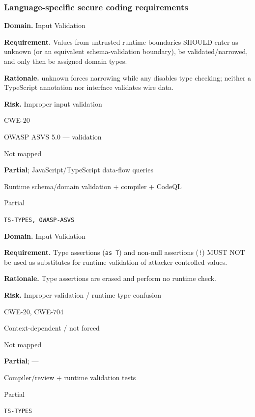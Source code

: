 \documentclass[10pt,letterpaper]{article}
\newcommand{\code}[1]{\texttt{\small #1}}
\newcommand{\prioritybadge}[2]{\tcbox[on line,boxrule=0pt,arc=1.2mm,boxsep=0.7mm,left=1mm,right=1mm,top=0.4mm,bottom=0.4mm,colback=#2!12,coltext=#2]{\scriptsize\bfseries #1}}
\begin{document}
\subsubsection*{Language-specific secure coding requirements}

\begin{rulebox}[title={\texttt{SCS-TS-INPUT-001} \hfill \prioritybadge{High Priority}{High}}]
\textbf{Domain.} Input Validation

\textbf{Requirement.} Values from untrusted runtime boundaries SHOULD enter as unknown (or an equivalent schema-validation boundary), be validated/narrowed, and only then be assigned domain types.

\textbf{Rationale.} unknown forces narrowing while any disables type checking; neither a TypeScript annotation nor interface validates wire data.

\textbf{Risk.} Improper input validation

\begin{description}[leftmargin=2.65cm,labelwidth=2.3cm,style=nextline,itemsep=1pt,topsep=3pt]
  \item[CWE] CWE-20
  \item[OWASP] OWASP ASVS 5.0 --- validation
  \item[CERT] Not mapped
  \item[CodeQL] \textbf{Partial}; JavaScript/TypeScript data-flow queries
  \item[Enforcement] Runtime schema/domain validation + compiler + CodeQL
  \item[Automation] Partial
  \item[Sources] \texttt{TS-TYPES, OWASP-ASVS}
\end{description}
\end{rulebox}

\begin{rulebox}[title={\texttt{SCS-TS-INPUT-002} \hfill \prioritybadge{High Priority}{High}}]
\textbf{Domain.} Input Validation

\textbf{Requirement.} Type assertions (\code{as T}) and non-null assertions (\code{!}) MUST NOT be used as substitutes for runtime validation of attacker-controlled values.

\textbf{Rationale.} Type assertions are erased and perform no runtime check.

\textbf{Risk.} Improper validation / runtime type confusion

\begin{description}[leftmargin=2.65cm,labelwidth=2.3cm,style=nextline,itemsep=1pt,topsep=3pt]
  \item[CWE] CWE-20, CWE-704
  \item[OWASP] Context-dependent / not forced
  \item[CERT] Not mapped
  \item[CodeQL] \textbf{Partial}; ---
  \item[Enforcement] Compiler/review + runtime validation tests
  \item[Automation] Partial
  \item[Sources] \texttt{TS-TYPES}
\end{description}
\end{rulebox}
\end{document}
